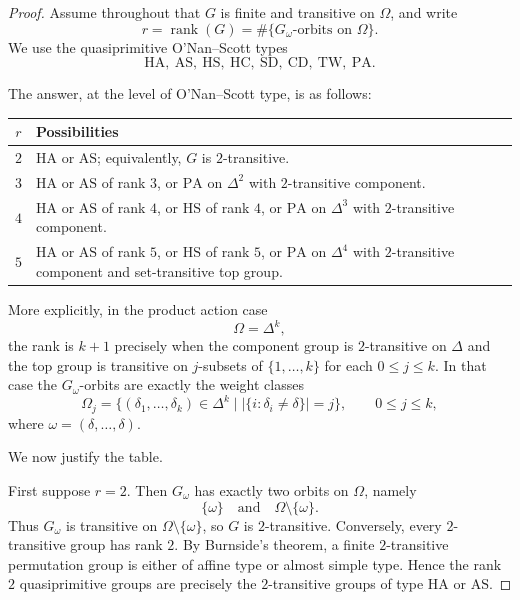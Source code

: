 \begin{proof}
    Assume throughout that \(G\) is finite and transitive on \(\Omega\), and write
    \[
    r=\operatorname{rank}(G)
    =
    \#\{\text{\(G_\omega\)-orbits on }\Omega\}.
    \]
    We use the quasiprimitive O'Nan--Scott types
    \[
    \mathrm{HA},\ \mathrm{AS},\ \mathrm{HS},\ \mathrm{HC},\ \mathrm{SD},\ \mathrm{CD},\ \mathrm{TW},\ \mathrm{PA}.
    \]
    
    The answer, at the level of O'Nan--Scott type, is as follows:
    \medskip
    \begin{center}
    \begin{tabular}{c|p{}}
    \toprule
    $r$ & Possibilities \\ \midrule
    $2$ & $\mathrm{HA}$ or $\mathrm{AS}$; equivalently, $G$ is $2$-transitive. \\[2mm]
    $3$ & $\mathrm{HA}$ or $\mathrm{AS}$ of rank $3$, or $\mathrm{PA}$ on $\Delta^2$ with $2$-transitive component. \\[2mm]
    $4$ & $\mathrm{HA}$ or $\mathrm{AS}$ of rank $4$, or $\mathrm{HS}$ of rank $4$, or $\mathrm{PA}$ on $\Delta^3$ with $2$-transitive component. \\[2mm]
    $5$ & $\mathrm{HA}$ or $\mathrm{AS}$ of rank $5$, or $\mathrm{HS}$ of rank $5$, or $\mathrm{PA}$ on $\Delta^4$ with $2$-transitive component and set-transitive top group. \\
    \bottomrule
    \end{tabular}
    \end{center}
    \medskip
    More explicitly, in the product action case
    \[
    \Omega=\Delta^k,
    \]
    the rank is \(k+1\) precisely when the component group is \(2\)-transitive on
    \(\Delta\) and the top group is transitive on \(j\)-subsets of
    \(\{1,\ldots,k\}\) for each \(0\leq j\leq k\). In that case the \(G_\omega\)-orbits
    are exactly the weight classes
    \[
    \Omega_j=\{(\delta_1,\ldots,\delta_k)\in \Delta^k
    \mid |\{i:\delta_i\neq \delta\}|=j\},
    \qquad 0\leq j\leq k,
    \]
    where \(\omega=(\delta,\ldots,\delta)\).
    
    We now justify the table.
    
    First suppose \(r=2\). Then \(G_\omega\) has exactly two orbits on \(\Omega\),
    namely
    \[
    \{\omega\}
    \quad\text{and}\quad
    \Omega\setminus\{\omega\}.
    \]
    Thus \(G_\omega\) is transitive on \(\Omega\setminus\{\omega\}\), so \(G\) is
    \(2\)-transitive. Conversely, every \(2\)-transitive group has rank \(2\).
    By Burnside's theorem, a finite \(2\)-transitive permutation group is either of
    affine type or almost simple type. Hence the rank \(2\) quasiprimitive groups are
    precisely the \(2\)-transitive groups of type \(\mathrm{HA}\) or \(\mathrm{AS}\).
    

\end{proof}
